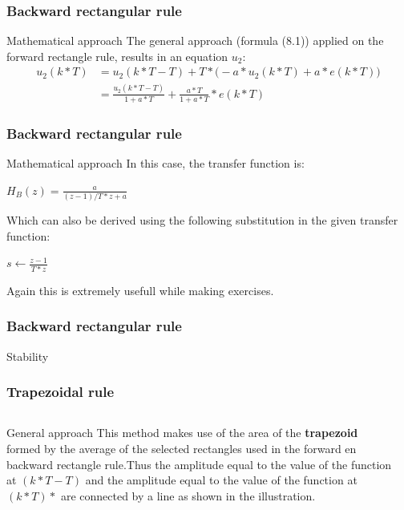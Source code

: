 \begin{frame}
	\frametitle{Backward rectangular rule}	
	\begin{block}{Mathematical approach}
		The general approach (formula (8.1)) applied on the forward rectangle rule, results in an equation $u_2$:
		\begin{align*}
		u_2(k*T)& =u_2(k*T - T) + T*\big(-a*u_2(k*T) + a*e(k*T) \big)\\
		& =\frac{u_2(k*T - T)}{1 + a*T} + \frac{a*T}{1 + a*T}*e(k*T)
		\end{align*}
	\end{block}
\end{frame}

\begin{frame}
	\frametitle{Backward rectangular rule}
	\begin{block}{Mathematical approach}
		In this case, the transfer function is:
		\begin{center}
			$H_B(z) = \frac{a}{(z-1)/T*z+a}$
		\end{center}
		Which can also be derived using the following substitution in the given transfer function:
		\begin{center}
			$s \gets \frac{z-1}{T*z}$
		\end{center}
		Again this is extremely usefull while making exercises.
	\end{block}
\end{frame}

\begin{frame}
	\frametitle{Backward rectangular rule}
	\begin{block}{Stability}
	\end{block}
\end{frame}	

\begin{frame}
	\frametitle{Trapezoidal rule}
	
\begin{columns}
	\begin{column}{0.5\textwidth}
	\begin{block}{General approach}
		This method makes use of the area of the \textbf{trapezoid} formed by the average of the selected rectangles used in the forward en backward rectangle rule.Thus the amplitude equal to the value of the function at $(k*T - T)$ and the amplitude equal to the value of the function at $(k*T)*$ are connected by a line as shown in the illustration.
	\end{block}	
	\end{column}

	\begin{column}{0.5\textwidth}
	\end{column}
	
\end{columns}
\end{frame}

